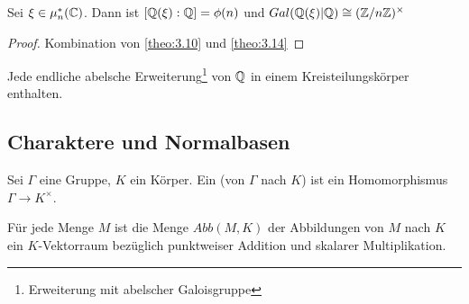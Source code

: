 \documentclass[../main.tex]{subfiles}
\begin{document}
\begin{corollary}
    Sei $\xi\in \mu_n^*(\mathbb{C})$.
     Dann ist $[\mathbb{Q}(\xi):\mathbb{Q}] = \phi(n)$ und $Gal(\mathbb{Q}(\xi)|\mathbb{Q})\cong (\mathbb{Z}/n\mathbb{Z})^\times$
\end{corollary}
\begin{proof}
    Kombination von \ref{theo:3.10} und \ref{theo:3.14}
\end{proof}
\begin{remark*}
      Jede endliche abelsche Erweiterung\footnote{Erweiterung mit abelscher Galoisgruppe} von $\mathbb{Q}$ in einem Kreisteilungskörper enthalten.
\end{remark*}
\subsection{Charaktere und Normalbasen}
\begin{definition}
    Sei $\Gamma$ eine Gruppe, $K$ ein Körper.
    Ein  (von $\Gamma$ nach $K$) ist ein Homomorphismus $\Gamma\rightarrow K^\times$.
\end{definition}
Für jede Menge $M$ ist die Menge $Abb(M,K)$ der Abbildungen von $M$ nach $K$ ein $K$-Vektorraum bezüglich punktweiser Addition und skalarer Multiplikation.
\end{document}
